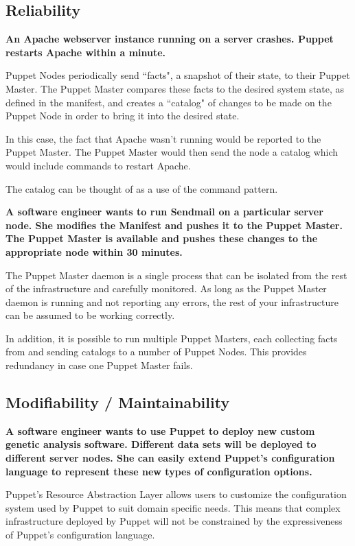 \documentclass[a4paper]{article}
\begin{document}
\subsection{Reliability}

\textbf{An Apache webserver instance running on a server crashes. Puppet restarts Apache within a minute.}

Puppet Nodes periodically send ``facts", a snapshot of their state, to their Puppet Master. The Puppet Master compares these facts to the desired system state, as defined in the manifest, and creates a ``catalog" of changes to be made on the Puppet Node in order to bring it into the desired state.

In this case, the fact that Apache wasn't running would be reported to the Puppet Master. The Puppet Master would then send the node a catalog which would include commands to restart Apache.

The catalog can be thought of as a use of the command pattern.

\textbf{A software engineer wants to run Sendmail on a particular server node. She modifies the Manifest and pushes it to the Puppet Master. The Puppet Master is available and pushes these changes to the appropriate node within 30 minutes.}

The Puppet Master daemon is a single process that can be isolated from the rest of the infrastructure and carefully monitored. As long as the Puppet Master daemon is running and not reporting any errors, the rest of your infrastructure can be assumed to be working correctly.

In addition, it is possible to run multiple Puppet Masters, each collecting facts from and sending catalogs to a number of Puppet Nodes. This provides redundancy in case one Puppet Master fails.

\subsection{Modifiability / Maintainability}

\textbf{A software engineer wants to use Puppet to deploy new custom genetic analysis software. Different data sets will be deployed to different server nodes. She can easily extend Puppet's configuration language to represent these new types of configuration options.}

Puppet's Resource Abstraction Layer allows users to customize the configuration system used by Puppet to suit domain specific needs. This means that complex infrastructure deployed by Puppet will not be constrained by the expressiveness of Puppet's configuration language.
\end{document}

